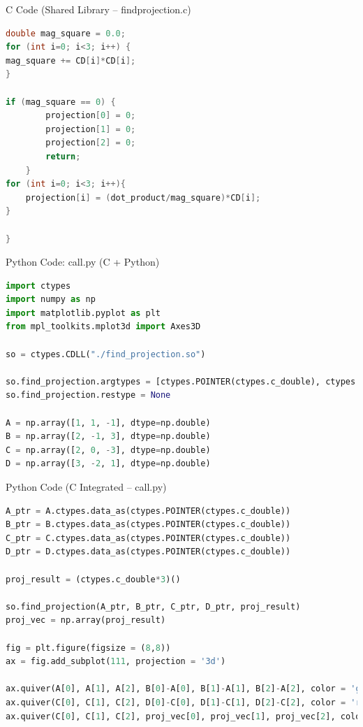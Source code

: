 \documentclass{beamer}
\begin{document}
\begin{frame}[fragile]{C Code (Shared Library – findprojection.c)}
\begin{lstlisting}[language=C]
double mag_square = 0.0;
for (int i=0; i<3; i++) {
mag_square += CD[i]*CD[i];
}

if (mag_square == 0) {
        projection[0] = 0;
        projection[1] = 0;
        projection[2] = 0;
        return;
    }
for (int i=0; i<3; i++){
    projection[i] = (dot_product/mag_square)*CD[i];
}

}
\end{lstlisting}
\end{frame}

\begin{frame}[fragile]{Python Code: call.py (C + Python)}
\begin{lstlisting}[language=Python]
import ctypes
import numpy as np
import matplotlib.pyplot as plt
from mpl_toolkits.mplot3d import Axes3D

so = ctypes.CDLL("./find_projection.so")

so.find_projection.argtypes = [ctypes.POINTER(ctypes.c_double), ctypes.POINTER(ctypes.c_double), ctypes.POINTER(ctypes.c_double), ctypes.POINTER(ctypes.c_double), ctypes.POINTER(ctypes.c_double)]
so.find_projection.restype = None

A = np.array([1, 1, -1], dtype=np.double)
B = np.array([2, -1, 3], dtype=np.double)
C = np.array([2, 0, -3], dtype=np.double)
D = np.array([3, -2, 1], dtype=np.double)
\end{lstlisting}
\end{frame}

\begin{frame}[fragile]{Python Code (C Integrated – call.py)
}
\begin{lstlisting}[language=Python]
A_ptr = A.ctypes.data_as(ctypes.POINTER(ctypes.c_double))
B_ptr = B.ctypes.data_as(ctypes.POINTER(ctypes.c_double))
C_ptr = C.ctypes.data_as(ctypes.POINTER(ctypes.c_double))
D_ptr = D.ctypes.data_as(ctypes.POINTER(ctypes.c_double))

proj_result = (ctypes.c_double*3)()

so.find_projection(A_ptr, B_ptr, C_ptr, D_ptr, proj_result)
proj_vec = np.array(proj_result)

fig = plt.figure(figsize = (8,8))
ax = fig.add_subplot(111, projection = '3d')

ax.quiver(A[0], A[1], A[2], B[0]-A[0], B[1]-A[1], B[2]-A[2], color = 'g', label = 'AB')
ax.quiver(C[0], C[1], C[2], D[0]-C[0], D[1]-C[1], D[2]-C[2], color = 'r', label = 'CD', linewidth=3, arrow_length_ratio=0.4)
ax.quiver(C[0], C[1], C[2], proj_vec[0], proj_vec[1], proj_vec[2], color='black', linestyle = '--', label='Projection of AB on CD')
\end{lstlisting}
\end{frame}
\end{document}
